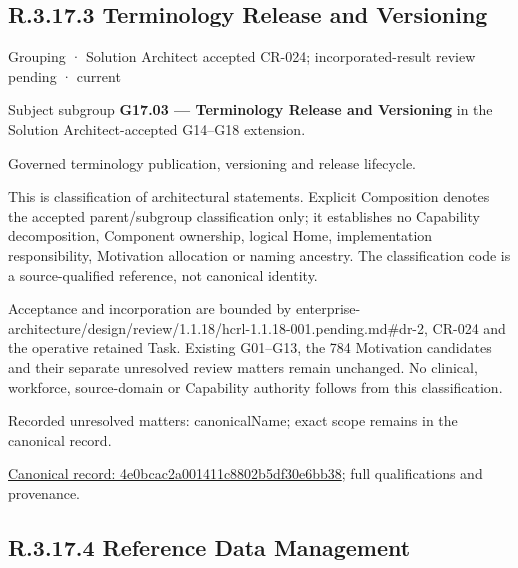 \subsection*{R.3.17.3 Terminology Release and Versioning}
\label{navigation:R.3.17.3}

\label{element:4e0bcac2a001411c8802b5df30e6bb38}
{\small Grouping · Solution Architect accepted CR-024; incorporated-result review pending · current}\par

Subject subgroup \textbf{G17.03 — Terminology Release and Versioning} in the Solution Architect-accepted G14–G18 extension.



Governed terminology publication, versioning and release lifecycle.



This is classification of architectural statements. Explicit Composition denotes the accepted parent/subgroup classification only; it establishes no Capability decomposition, Component ownership, logical Home, implementation responsibility, Motivation allocation or naming ancestry. The classification code is a source-qualified reference, not canonical identity.



Acceptance and incorporation are bounded by enterprise-architecture/design/review/1.1.18/hcrl-1.1.18-001.pending.md\#dr-2, CR-024 and the operative retained Task. Existing G01–G13, the 784 Motivation candidates and their separate unresolved review matters remain unchanged. No clinical, workforce, source-domain or Capability authority follows from this classification.


{\small Recorded unresolved matters: canonicalName; exact scope remains in the canonical record.}\par
{\footnotesize \href{../../../../continuum/grouping/4e0bcac2a001411c8802b5df30e6bb38.md}{Canonical record: 4e0bcac2a001411c8802b5df30e6bb38}; full qualifications and provenance.}\par
\subsection*{R.3.17.4 Reference Data Management}
\label{navigation:R.3.17.4}

